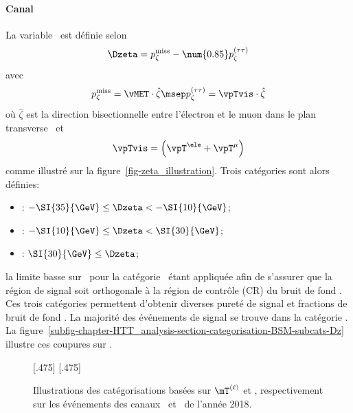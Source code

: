 \paragraph{Canal \ele\mu}
La variable \Dzeta\ est définie selon
\begin{equation}
\Dzeta = p_\zeta^\text{miss} - \num{0.85} p_\zeta^{(\tau\tau)}
\label{eq-Dzeta_def}
\end{equation}
avec
\begin{equation}
p_\zeta^\text{miss} = \vMET \cdot \hat{\zeta}
\msep
p_\zeta^{(\tau\tau)} = \vpTvis \cdot \hat{\zeta}
\end{equation}
où $\hat{\zeta}$ est la direction bisectionnelle entre l'électron et le muon dans le plan transverse~\cite{Jang_thesis}
et
\begin{equation}
\vpTvis = \left( \vpT^{\ele} + \vpT^{\mu} \right)
\label{eq-pTvis_def}
\end{equation}
comme illustré sur la figure~\ref{fig-zeta_illustration}.
Trois catégories sont alors définies:
\begin{itemize}
\item \CATlowdz: $-\SI{35}{\GeV} \leq \Dzeta < -\SI{10}{\GeV}$;
\item \CATmediumdz: $-\SI{10}{\GeV} \leq \Dzeta < \SI{30}{\GeV}$;
\item \CAThighdz: $\SI{30}{\GeV} \leq \Dzeta$;
\end{itemize}
la limite basse sur \Dzeta\ pour la catégorie \CATlowdz\ étant appliquée afin de s'assurer que la région de signal soit orthogonale à la région de contrôle (CR) du bruit de fond \ttbar.
Ces trois catégories permettent d'obtenir diverses pureté de signal et fractions de bruit de fond \ttbar.
La majorité des événements de signal se trouve dans la catégorie \CATmediumdz.
La figure~\ref{subfig-chapter-HTT_analysis-section-categorisation-BSM-subcats-Dz} illustre ces coupures sur \Dzeta.
\begin{figure}[h]
\centering

[.475\textwidth]
{}
\hfill
{}[.475\textwidth]
{}

\caption[Illustrations des catégorisations basées sur $\mT^{(\ell)}$ et \Dzeta]{Illustrations des catégorisations basées sur $\mT^{(\ell)}$ et \Dzeta, respectivement sur les événements des canaux \ele\tauh\ et \ele\mu\ de l'année 2018.}
\label{fig-chapter-HTT_analysis-section-categorisation-BSM-subcats}
\end{figure}
